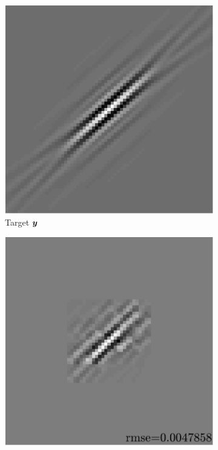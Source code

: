 \begin{figure}[!ht]\centering
\begin{subfigure}[b]{0.4\textwidth}\centering
\includegraphics[width=\linewidth]{figures/xp/n4/xp_128x128_sc2_angl1_K3_S3_node4_target.pdf}
\caption{Target $\bm{y}$}
\end{subfigure}
\begin{subfigure}[b]{0.4\linewidth}\centering
\includegraphics[width=\linewidth]{figures/xp/n4/xp_128x128_sc2_angl1_K3_S3_node4_approx.pdf}

\end{subfigure}
\end{figure}
